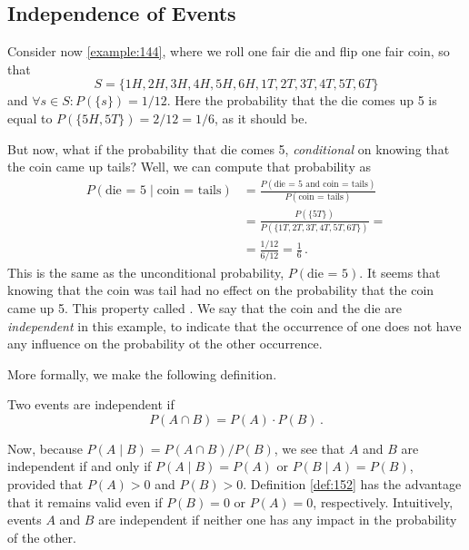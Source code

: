 \subsection{Independence of Events}\label{independence_of_events}
Consider now \autoref{example:144}, where we roll one fair die and flip one fair coin, so that
$$
S=\{1H, 2H, 3H, 4H, 5H, 6H, 1T, 2T, 3T, 4T, 5T, 6T\}
$$
and $\forall s\in S:P(\{s\})=1/12$. Here the probability that the die comes up 5 is equal to $P(\{5H,5T\})=2/12=1/6$, as it should be.

But now, what if the probability that die comes 5, \emph{conditional} on knowing that the coin came up tails? Well, we can compute that probability as
\begin{equation*}
    \begin{split}
P(\text{die = 5}\mid\text{coin = tails}) &= \frac{P(\text{die = 5 and coin = tails})}{P(\text{coin = tails})} \\
                                         & = \frac{P(\{5T\})}{P(\{1T,2T,3T,4T,5T,6T\})}= \\
                                         &=\frac{1/12}{6/12}=\frac1 6\,.
    \end{split}
\end{equation*}
This is the same as the unconditional probability, $P(\text{die = 5})$. It seems that knowing that the coin was tail had no effect on the probability that the coin came up 5. This property called . We say that the coin and the die are \emph{independent} in this example, to indicate that the occurrence of one does not have any influence on the probability ot the other occurrence.

More formally, we make the following definition.

\begin{definition}\label{def:152}
    Two events are independent if
    $$
        P(A\cap B) = P(A) \cdot P(B)\,.
    $$
\end{definition}
Now, because $P(A\mid B)=P(A\cap B)/P(B)$, we see that $A$ and $B$ are independent if and only if $P(A\mid B)=P(A)$ or $P(B\mid A)=P(B)$, provided that $P(A)>0$ and $P(B)>0$. Definition \autoref{def:152} has the advantage that it remains valid even if $P(B)=0$ or $P(A)=0$, respectively. Intuitively, events $A$ and $B$ are independent if neither one has any impact in the probability of the other.

